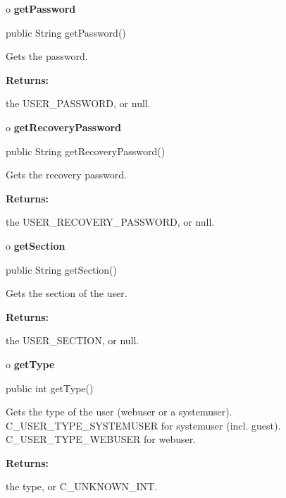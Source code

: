 o {\bf getPassword} 

\begin{PRE}
 public String getPassword()
\end{PRE}

\begin{description}
\htmlDD Gets the password. 

\begin{description}
\item {\bf Returns:}  

the USER\_PASSWORD, or null.  
\end{description}

\end{description}

o {\bf getRecoveryPassword} 

\begin{PRE}
 public String getRecoveryPassword()
\end{PRE}

\begin{description}
\htmlDD Gets the recovery password. 

\begin{description}
\item {\bf Returns:}  

the USER\_RECOVERY\_PASSWORD, or null.  
\end{description}

\end{description}

o {\bf getSection} 

\begin{PRE}
 public String getSection()
\end{PRE}

\begin{description}
\htmlDD Gets the section of the user. 

\begin{description}
\item {\bf Returns:}  

the USER\_SECTION, or null.  
\end{description}

\end{description}

o {\bf getType} 

\begin{PRE}
 public int getType()
\end{PRE}

\begin{description}
\htmlDD Gets the type of the user (webuser or a systemuser).
C\_USER\_TYPE\_SYSTEMUSER for systemuser (incl. guest). C\_USER\_TYPE\_WEBUSER
for webuser. 

\begin{description}
\item {\bf Returns:}  

the type, or C\_UNKNOWN\_INT.  
\end{description}

\end{description}

